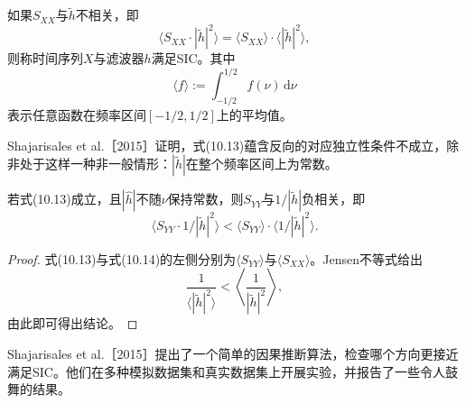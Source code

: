 \begin{definition}[SIC]
如果$S_{XX}$与$\widetilde h$不相关，即
\begin{equation}
 \langle S_{XX}\cdot|\widetilde h|^2\rangle
 =\langle S_{XX}\rangle\cdot\langle|\widetilde h|^2\rangle,
 \tag{10.13}
\end{equation}
则称时间序列$X$与滤波器$h$满足SIC。其中
\[
 \langle f\rangle:=\int_{-1/2}^{1/2}f(\nu)\,\mathrm d\nu
\]
表示任意函数在频率区间$[-1/2,1/2]$上的平均值。
\end{definition}

Shajarisales et al.［2015］证明，式(10.13)蕴含反向的对应独立性条件不成立，除非处于这样一种非一般情形：$|\widetilde h|$在整个频率区间上为常数。
\begin{theorem}[基于SIC的可识别性]
若式(10.13)成立，且$|\widehat h|$不随$\nu$保持常数，则$S_{YY}$与$1/|\widetilde h|$负相关，即
\begin{equation}
 \langle S_{YY}\cdot1/|\widetilde h|^2\rangle
 <\langle S_{YY}\rangle\cdot\langle1/|\widetilde h|^2\rangle.
 \tag{10.14}
\end{equation}
\end{theorem}
\begin{proof}
式(10.13)与式(10.14)的左侧分别为$\langle S_{YY}\rangle$与$\langle S_{XX}\rangle$。Jensen不等式给出
\[
 \frac{1}{\langle|\widetilde h|^2\rangle}
 <\left\langle\frac{1}{|\widetilde h|^2}\right\rangle,
\]
由此即可得出结论。
\end{proof}

Shajarisales et al.［2015］提出了一个简单的因果推断算法，检查哪个方向更接近满足SIC。他们在多种模拟数据集和真实数据集上开展实验，并报告了一些令人鼓舞的结果。
\FloatBarrier
